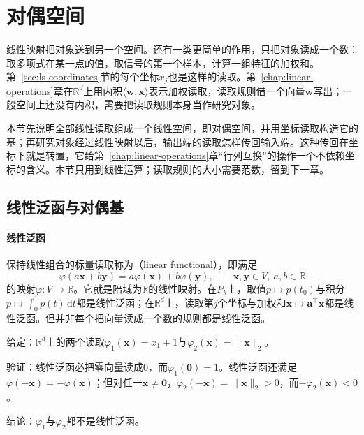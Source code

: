 
\section{对偶空间}
\label{sec:ls-dual-spaces}

线性映射把对象送到另一个空间。还有一类更简单的作用，只把对象读成一个数：取多项式在某一点的值，取信号的第一个样本，计算一组特征的加权和。第~\ref{sec:ls-coordinates}节的每个坐标$x_j$也是这样的读取。第~\ref{chap:linear-operations}章在$\mathbb R^d$上用内积$\langle\bm w,\bm x\rangle$表示加权读取，读取规则借一个向量$\bm w$写出；一般空间上还没有内积，需要把读取规则本身当作研究对象。

本节先说明全部线性读取组成一个线性空间，即对偶空间，并用坐标读取构造它的基；再研究对象经过线性映射以后，输出端的读取怎样传回输入端。这种传回在坐标下就是转置，它给第~\ref{chap:linear-operations}章“行列互换”的操作一个不依赖坐标的含义。本节只用到线性运算；读取规则的大小需要范数，留到下一章。

\subsection{线性泛函与对偶基}
\label{sec:ls-dual-space}

\paragraph{线性泛函}
保持线性组合的标量读取称为（linear functional），即满足
\[
\varphi(a\bm x+b\bm y)=a\varphi(\bm x)+b\varphi(\bm y),\qquad\bm x,\bm y\in V,\ a,b\in\mathbb R
\]
的映射$\varphi:V\to\mathbb R$。它就是陪域为$\mathbb R$的线性映射。在$P_k$上，取值$p\mapsto p(t_0)$与积分$p\mapsto\int_0^1p(t)\,\mathrm dt$都是线性泛函；在$\mathbb R^d$上，读取第$j$个坐标与加权和$\bm x\mapsto\bm a^\top\bm x$都是线性泛函。但并非每个把向量读成一个数的规则都是线性泛函。
\begin{example}[反例：两个非线性的读取]
\label{ex:ls-nonlinear-readouts}
给定：$\mathbb R^d$上的两个读取$\varphi_1(\bm x)=x_1+1$与$\varphi_2(\bm x)=\lVert\bm x\rVert_2$。

验证：线性泛函必把零向量读成$0$，而$\varphi_1(\bm0)=1$。线性泛函还满足$\varphi(-\bm x)=-\varphi(\bm x)$；但对任一$\bm x\neq\bm0$，$\varphi_2(-\bm x)=\lVert\bm x\rVert_2>0$，而$-\varphi_2(\bm x)<0$。

结论：$\varphi_1$与$\varphi_2$都不是线性泛函。
\end{example}

